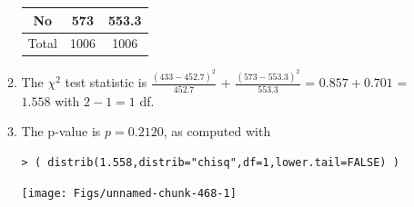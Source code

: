 \documentclass[10pt,openany]{book}\usepackage[]{graphicx}\usepackage[]{color}
\makeatletter
\newenvironment{kframe}{%
 \def\at@end@of@kframe{}%
 \ifinner\ifhmode%
  \def\at@end@of@kframe{\end{minipage}}%
  \begin{minipage}{\columnwidth}%
 \fi\fi%
 \def\FrameCommand##1{\hskip\@totalleftmargin \hskip-\fboxsep
 \colorbox{shadecolor}{##1}\hskip-\fboxsep
     \hskip-\linewidth \hskip-\@totalleftmargin \hskip\columnwidth}%
 \MakeFramed {\advance\hsize-\width
   \@totalleftmargin\z@ \linewidth\hsize
   \@setminipage}}%
 {\par\unskip\endMakeFramed%
 \at@end@of@kframe}
\newenvironment{knitrout}{}{} %
\makeatother
\begin{document}
\begin{itemize}
\begin{enumerate}
\begin{center}
\begin{tabular}{ccc}
            No  & 573 & 553.3 \\
            \hline
            Total & 1006 & 1006 \\
            \hline\hline
          \end{tabular}
        \end{center}
      \item The $\chi^{2}$ test statistic is $\frac{(433-452.7)^{2}}{452.7}$ + $\frac{(573-553.3)^{2}}{553.3}$ = $0.857+0.701$ = $1.558$ with $2-1=1$ df.
      \item The p-value is $p=0.2120$, as computed with
\begin{knitrout}
\color{fgcolor}\begin{kframe}
\begin{verbatim}
> ( distrib(1.558,distrib="chisq",df=1,lower.tail=FALSE) )
\end{verbatim}


{\ttfamily\noindent\bfseries\color{errorcolor}{Error in plot.window(...): need finite 'ylim' values}}\end{kframe}

{\centering \texttt{[image: Figs/unnamed-chunk-468-1]} 

}




\end{knitrout}
\end{enumerate}
\end{itemize}
\end{document}
